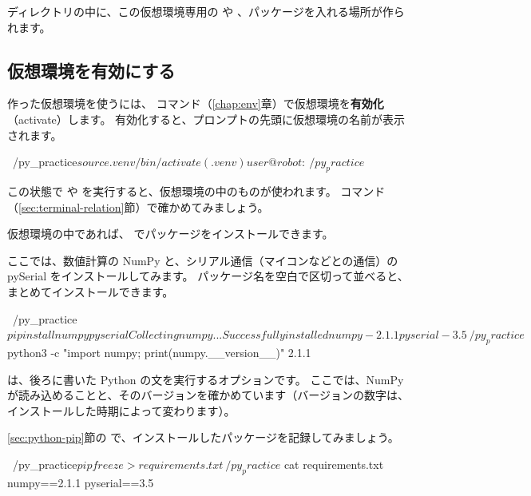  ディレクトリの中に、この仮想環境専用の  や 、パッケージを入れる場所が作られます。

\subsection{仮想環境を有効にする}

作った仮想環境を使うには、 コマンド（\ref{chap:env}章）で仮想環境を\textbf{有効化}（activate）します。
有効化すると、プロンプトの先頭に仮想環境の名前が表示されます。

\begin{terminal}[仮想環境を有効にする]
~/py_practice$ source .venv/bin/activate
(.venv) user@robot:~/py_practice$
\end{terminal}

この状態で  や  を実行すると、仮想環境の中のものが使われます。
 コマンド（\ref{sec:terminal-relation}節）で確かめてみましょう。


仮想環境の中であれば、 でパッケージをインストールできます。

ここでは、数値計算の NumPy と、シリアル通信（マイコンなどとの通信）の pySerial をインストールしてみます。
パッケージ名を空白で区切って並べると、まとめてインストールできます。

\begin{terminal}[仮想環境でパッケージを入れる]
~/py_practice$ pip install numpy pyserial
Collecting numpy
...
Successfully installed numpy-2.1.1 pyserial-3.5
~/py_practice$ python3 -c "import numpy; print(numpy.__version__)"
2.1.1
\end{terminal}

 は、後ろに書いた Python の文を実行するオプションです。
ここでは、NumPy が読み込めることと、そのバージョンを確かめています（バージョンの数字は、インストールした時期によって変わります）。

\ref{sec:python-pip}節の  で、インストールしたパッケージを記録してみましょう。

\begin{terminal}[仮想環境のパッケージを記録する]
~/py_practice$ pip freeze > requirements.txt
~/py_practice$ cat requirements.txt
numpy==2.1.1
pyserial==3.5
\end{terminal}

